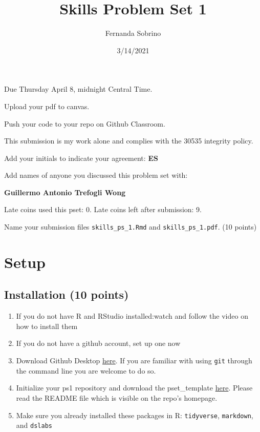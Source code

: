 \documentclass[
]{article}
\title{Skills Problem Set 1}
\author{Fernanda Sobrino}
\date{3/14/2021}
\providecommand{\tightlist}{%
  \setlength{\itemsep}{0pt}\setlength{\parskip}{0pt}}
\begin{document}
\maketitle

Due Thursday April 8, midnight Central Time.

Upload your pdf to canvas.

Push your code to your repo on Github Classroom.

This submission is my work alone and complies with the 30535 integrity
policy.

Add your initials to indicate your agreement: \textbf{ES}

Add names of anyone you discussed this problem set with:

\textbf{Guillermo Antonio Trefogli Wong}

Late coins used this pset: 0. Late coins left after submission: 9.

Name your submission files \texttt{skills\_ps\_1.Rmd} and
\texttt{skills\_ps\_1.pdf}. (10 points)

\hypertarget{setup}{%
\section{Setup}\label{setup}}

\hypertarget{installation-10-points}{%
\subsection{Installation (10 points)}\label{installation-10-points}}

\begin{enumerate}
\def\labelenumi{\arabic{enumi}.}
\tightlist
\item
  If you do not have R and RStudio installed:watch and follow the video
  on how to install them
\item
  If you do not have a github account, set up one now
\item
  Download Github Desktop \href{https://desktop.github.com/}{here}. If
  you are familiar with using \texttt{git} through the command line you
  are welcome to do so.
\item
  Initialize your ps1 repository and download the pset\_template
  \href{https://classroom.github.com/a/HL4qfScl}{here}. Please read the
  README file which is visible on the repo's homepage.
\item
  Make sure you already installed these packages in R:
  \texttt{tidyverse}, \texttt{markdown}, and \texttt{dslabs}
\end{enumerate}
\end{document}
